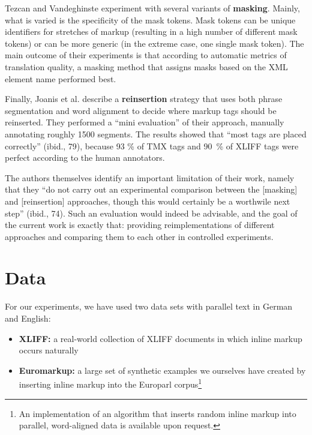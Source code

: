 \documentclass[11pt,letterpaper]{article}
\begin{document}
Tezcan and Vandeghinste  experiment with several variants of \textbf{masking}. Mainly, what is varied is the specificity of the mask tokens. Mask tokens can be unique identifiers for stretches of markup (resulting in a high number of different mask tokens) or can be more generic (in the extreme case, one single mask token). The main outcome of their experiments is that according to automatic metrics of translation quality, a masking method that assigns masks based on the XML element name performed best.

Finally, Joanis et al.  describe a \textbf{reinsertion} strategy that uses both phrase segmentation and word alignment to decide where markup tags should be reinserted. They performed a ``mini evaluation'' of their approach, manually annotating roughly 1500 segments. The results showed that ``most tags are placed correctly'' (ibid., 79), because 93 \% of TMX tags and 90~\% of XLIFF tags were perfect according to the human annotators.

The authors themselves identify an important limitation of their work, namely that they ``do not carry out an experimental comparison between the [masking] and [reinsertion] approaches, though this would certainly be a worthwile next step'' (ibid., 74). Such an evaluation would indeed be advisable, and the goal of the current work is exactly that: providing reimplementations of different approaches and comparing them to each other in controlled experiments.



\section{Data}

For our experiments, we have used two data sets with parallel text in German and English:

\begin{itemize}
\item \textbf{XLIFF:} a real-world collection of XLIFF documents in which inline markup occurs naturally
\item \textbf{Euromarkup:} a large set of synthetic examples we ourselves have created by inserting inline markup into the Europarl corpus\footnote{An implementation of an algorithm that inserts random inline markup into parallel, word-aligned data is available upon request.}
\end{itemize}
\end{document}
